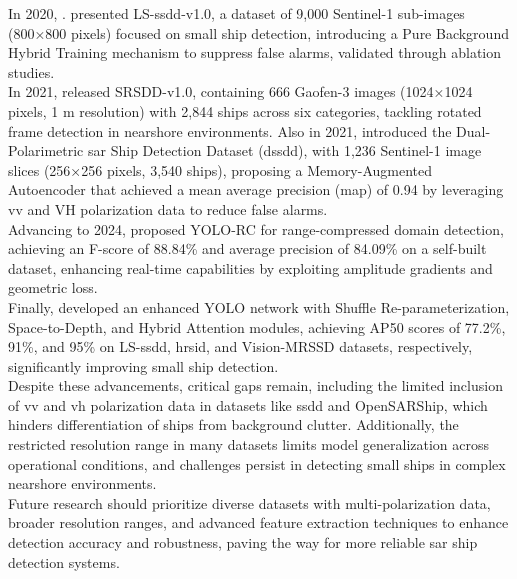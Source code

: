 \documentclass{article}
\begin{document}
	In 2020, \cite{rs12182997}. presented LS-\acrshort{ssdd}-v1.0, a dataset of 9,000 Sentinel-1 sub-images (800×800 pixels) focused on small ship detection, introducing a Pure Background Hybrid Training mechanism to suppress false alarms, validated through ablation studies. \\
	
	In 2021, \cite{rs13245104} released SRSDD-v1.0, containing 666 Gaofen-3 images (1024×1024 pixels, 1 m resolution) with 2,844 ships across six categories, tackling rotated frame detection in nearshore environments. Also in 2021, \cite{s21248478} introduced the Dual-Polarimetric \acrshort{sar} Ship Detection Dataset (\acrshort{dssdd}), with 1,236 Sentinel-1 image slices (256×256 pixels, 3,540 ships), proposing a Memory-Augmented Autoencoder that achieved a mean average precision (\acrshort{map}) of 0.94 by leveraging \acrshort{vv} and VH polarization data to reduce false alarms. \\
	
	Advancing to 2024, \cite{tan2024yolo} proposed YOLO-RC for range-compressed domain detection, achieving an F-score of 88.84\% and average precision of 84.09\% on a self-built dataset, enhancing real-time capabilities by exploiting amplitude gradients and geometric loss. \\
	
	Finally, \cite{sun2025arbitrary} developed an enhanced YOLO network with Shuffle Re-parameterization, Space-to-Depth, and Hybrid Attention modules, achieving AP50 scores of 77.2\%, 91\%, and 95\% on LS-\acrshort{ssdd}, \acrshort{hrsid}, and Vision-MRSSD datasets, respectively, significantly improving small ship detection. \\
	
	Despite these advancements, critical gaps remain, including the limited inclusion of \acrshort{vv} and \acrshort{vh} polarization data in datasets like \acrshort{ssdd} and OpenSARShip, which hinders differentiation of ships from background clutter. Additionally, the restricted resolution range in many datasets limits model generalization across operational conditions, and challenges persist in detecting small ships in complex nearshore environments. \\
	
	Future research should prioritize diverse datasets with multi-polarization data, broader resolution ranges, and advanced feature extraction techniques to enhance detection accuracy and robustness, paving the way for more reliable \acrshort{sar} ship detection systems.\\
	
\end{document}

